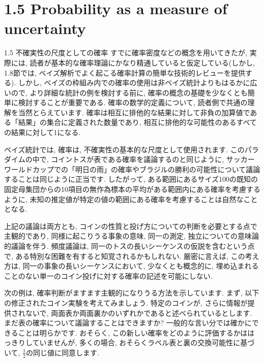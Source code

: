 \documentclass[10pt,dvipdfmx,a4]{beamer}
\begin{document}
\section{1.5 Probability as a measure of uncertainty}
\begin{frame}{1.5 不確実性の尺度としての確率}
すでに確率密度などの概念を用いてきたが, 実際には, 読者が基本的な確率理論にかなり精通していると仮定している(しかし, 1.8節では, ベイズ解析でよく起こる確率計算の簡単な技術的レビューを提供する).
しかし, ベイズの枠組み内での確率の使用は非ベイズ統計よりもはるかに広いので, より詳細な統計の例を検討する前に, 確率の概念の基礎を少なくとも簡単に検討することが重要である.
確率の数学的定義について, 読者側で共通の理解を当然とらえています.
確率は相互に排他的な結果に対して非負の加算値である「結果」の集合に定義された数量であり, 相互に排他的な可能性のあるすべての結果に対して1になる.

ベイズ統計では, 確率は, 不確実性の基本的な尺度として使用されます.
このパラダイムの中で, コイントスが表である確率を議論するのと同じように, サッカーワールドカップでの「明日の雨」の確率やブラジルの勝利の可能性について議論することは同じように正当です.
したがって, ある範囲にあるサイズ100の既知の固定母集団からの10項目の無作為標本の平均がある範囲内にある確率を考慮するように, 未知の推定値が特定の値の範囲にある確率を考慮することは自然なこととなる.
\end{frame}


\begin{frame}
上記の議論は両方とも, コインの性質と投げ方についての判断を必要とする点で主観的であり, 同様に起こりうる事象の意味, 同一の測定, 独立についての意味論的議論を伴う.
頻度議論は, 同一のトスの長いシーケンスの仮説を含むという点で, ある特別な困難を有すると知覚されるかもしれない.
厳密に言えば, この考え方は, 同一の事象の長いシーケンスにおいて, 少なくとも概念的に, 埋め込まれることのない単一のコイン投げに対する確率の記述を可能にしない.

次の例は, 確率判断がますます主観的になりうる方法を示しています.
まず, 以下の修正されたコイン実験を考えてみましょう.
特定のコインが, さらに情報が提供されないで, 両面表か両面裏かのいずれかであると述べられているとします.
まだ表の確率について議論することはできますか?
一般的な言い分では確かにできることは明らかです.
おそらく, この新しい確率をどのように評価するかははっきりしていませんが, 多くの場合, おそらくラベル表と裏の交換可能性に基づいて, $\tfrac{1}{2}$の同じ値に同意します.
\end{frame}
\end{document}
